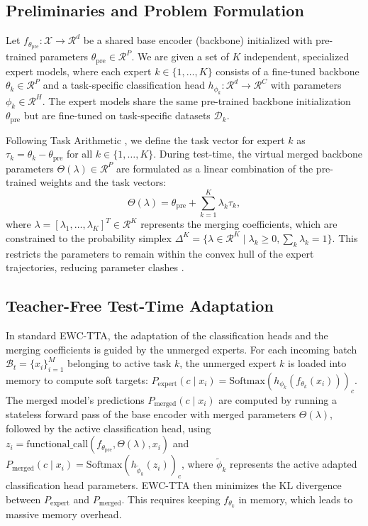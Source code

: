 \documentclass{article}
\theoremstyle{plain}
\theoremstyle{definition}
\theoremstyle{remark}
\begin{document}
\subsection{Preliminaries and Problem Formulation}
Let $f_{\theta_{\text{pre}}}: \mathcal{X} \rightarrow \mathcal{R}^d$ be a shared base encoder (backbone) initialized with pre-trained parameters $\theta_{\text{pre}} \in \mathcal{R}^P$. We are given a set of $K$ independent, specialized expert models, where each expert $k \in \{1, \dots, K\}$ consists of a fine-tuned backbone $\theta_k \in \mathcal{R}^P$ and a task-specific classification head $h_{\phi_k}: \mathcal{R}^d \rightarrow \mathcal{R}^C$ with parameters $\phi_k \in \mathcal{R}^H$. The expert models share the same pre-trained backbone initialization $\theta_{\text{pre}}$ but are fine-tuned on task-specific datasets $\mathcal{D}_k$.

Following Task Arithmetic \cite{ilharco2022editing}, we define the task vector for expert $k$ as $\tau_k = \theta_k - \theta_{\text{pre}}$ for all $k \in \{1, \dots, K\}$.
During test-time, the virtual merged backbone parameters $\Theta(\lambda) \in \mathcal{R}^P$ are formulated as a linear combination of the pre-trained weights and the task vectors:
\begin{equation}
    \Theta(\lambda) = \theta_{\text{pre}} + \sum_{k=1}^K \lambda_k \tau_k,
\end{equation}
where $\lambda = [\lambda_1, \dots, \lambda_K]^T \in \mathcal{R}^K$ represents the merging coefficients, which are constrained to the probability simplex $\Delta^K = \{ \lambda \in \mathcal{R}^K \mid \lambda_k \geq 0, \sum_k \lambda_k = 1 \}$. This restricts the parameters to remain within the convex hull of the expert trajectories, reducing parameter clashes \cite{nacke2023synergistic}.

\subsection{Teacher-Free Test-Time Adaptation}
In standard EWC-TTA, the adaptation of the classification heads and the merging coefficients is guided by the unmerged experts. For each incoming batch $\mathcal{B}_t = \{x_i\}_{i=1}^M$ belonging to active task $k$, the unmerged expert $k$ is loaded into memory to compute soft targets: $P_{\text{expert}}(c \mid x_i) = \text{Softmax}\left(h_{\phi_k}(f_{\theta_k}(x_i))\right)_c$.
The merged model's predictions $P_{\text{merged}}(c \mid x_i)$ are computed by running a stateless forward pass of the base encoder with merged parameters $\Theta(\lambda)$, followed by the active classification head, using $z_i = \text{functional\_call}\left(f_{\theta_{\text{pre}}}, \Theta(\lambda), x_i\right)$ and $P_{\text{merged}}(c \mid x_i) = \text{Softmax}\left(h_{\tilde{\phi}_k}(z_i)\right)_c$, where $\tilde{\phi}_k$ represents the active adapted classification head parameters. EWC-TTA then minimizes the KL divergence between $P_{\text{expert}}$ and $P_{\text{merged}}$. This requires keeping $f_{\theta_k}$ in memory, which leads to massive memory overhead.
\end{document}
